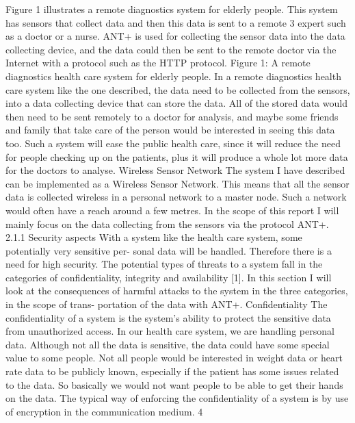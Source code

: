 Figure 1 illustrates a remote diagnostics system for elderly people. This system has sensors that collect data and then this data is sent to a remote
3
expert such as a doctor or a nurse. ANT+ is used for collecting the sensor data into the data collecting device, and the data could then be sent to the remote doctor via the Internet with a protocol such as the HTTP protocol.
Figure 1: A remote diagnostics health care system for elderly people.
In a remote diagnostics health care system like the one described, the data need to be collected from the sensors, into a data collecting device that can store the data. All of the stored data would then need to be sent remotely to a doctor for analysis, and maybe some friends and family that take care of the person would be interested in seeing this data too. Such a system will ease the public health care, since it will reduce the need for people checking up on the patients, plus it will produce a whole lot more data for the doctors to analyse.
Wireless Sensor Network The system I have described can be implemented as a Wireless Sensor Network. This means that all the sensor data is collected wireless in a personal network to a master node. Such a network would often have a reach around a few metres. In the scope of this report I will mainly focus on the data collecting from the sensors via the protocol ANT+.
2.1.1 Security aspects
With a system like the health care system, some potentially very sensitive per- sonal data will be handled. Therefore there is a need for high security. The potential types of threats to a system fall in the categories of confidentiality, integrity and availability [1]. In this section I will look at the consequences of harmful attacks to the system in the three categories, in the scope of trans- portation of the data with ANT+.
Confidentiality The confidentiality of a system is the system’s ability to protect the sensitive data from unauthorized access. In our health care system, we are handling personal data. Although not all the data is sensitive, the data could have some special value to some people. Not all people would be interested in weight data or heart rate data to be publicly known, especially if the patient has some issues related to the data. So basically we would not want people to be able to get their hands on the data. The typical way of enforcing the confidentiality of a system is by use of encryption in the communication medium.
4
 
